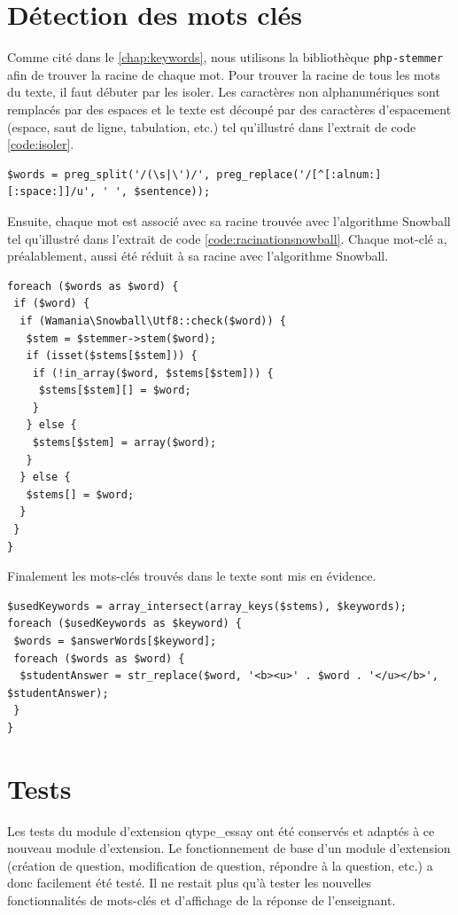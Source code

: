 \section{D\'etection des mots cl\'es}
Comme cit\'e dans le \autoref{chap:keywords}, nous utilisons la biblioth\`eque \texttt{php-stemmer} afin de trouver la racine de chaque mot.
Pour trouver la racine de tous les mots du texte, il faut d\'ebuter par les isoler.
Les caract\`eres non alphanum\'eriques sont remplac\'es par des espaces et le texte est d\'ecoup\'e par des caract\`eres d'espacement (espace, saut de ligne, tabulation, etc.) tel qu'illustr\'e dans l'extrait de code \ref{code:isoler}.
\begin{lstfloat}
\begin{lstlisting}[frame=l]
$words = preg_split('/(\s|\')/', preg_replace('/[^[:alnum:][:space:]]/u', ' ', $sentence));
\end{lstlisting}
\caption{Isoler les mots du texte.}
\label{code:isoler}
\end{lstfloat}
Ensuite, chaque mot est associ\'e avec sa racine trouv\'ee avec l'algorithme Snowball tel qu'illustr\'e dans l'extrait de code \ref{code:racinationsnowball}.
Chaque mot-cl\'e a, pr\'ealablement, aussi \'et\'e r\'eduit \`a sa racine avec l'algorithme Snowball.
\begin{lstfloat}
\begin{lstlisting}[frame=l]
foreach ($words as $word) {
 if ($word) {
  if (Wamania\Snowball\Utf8::check($word)) {
   $stem = $stemmer->stem($word);
   if (isset($stems[$stem])) {
    if (!in_array($word, $stems[$stem])) {
     $stems[$stem][] = $word;
    }
   } else {
    $stems[$stem] = array($word);
   }
  } else {
   $stems[] = $word;
  }
 }
}
\end{lstlisting}
\caption{Racination des mots avec Snowball.}
\label{code:racinationsnowball}
\end{lstfloat}
Finalement les mots-cl\'es trouv\'es dans le texte sont mis en \'evidence.
\begin{lstfloat}
\begin{lstlisting}[frame=l]
$usedKeywords = array_intersect(array_keys($stems), $keywords);
foreach ($usedKeywords as $keyword) {
 $words = $answerWords[$keyword];
 foreach ($words as $word) {
  $studentAnswer = str_replace($word, '<b><u>' . $word . '</u></b>', $studentAnswer);
 }
}
\end{lstlisting}
\caption{Mise en \'evidence des mots-cl\'es trouv\'es.}
\label{code:mots-cles}
\end{lstfloat}
\section{Tests} \label{dev_test}
Les tests du module d'extension \og qtype\_essay \fg{} ont \'et\'e conserv\'es et adapt\'es \`a ce nouveau module d'extension.
Le fonctionnement de base d'un module d'extension (cr\'eation de question, modification de question, r\'epondre \`a la question, etc.) a donc facilement \'et\'e test\'e.
Il ne restait plus qu'\`a tester les nouvelles fonctionnalit\'es de mots-cl\'es et d'affichage de la r\'eponse de l'enseignant.
